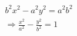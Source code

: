 \documentclass[preview]{standalone}
\begin{document}
\begin{align*}
b^2 x^2 - a^2 y^2 = a^2 b^2 \\ \Rightarrow \frac{x^2}{a^2} - \frac{y^2}{b^2} = 1
\end{align*}
\end{document}
